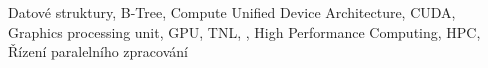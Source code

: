 Datové struktury, B-Tree, Compute Unified Device Architecture, CUDA, Graphics processing unit, GPU, TNL, \CC, High Performance Computing, HPC, Řízení paralelního zpracování